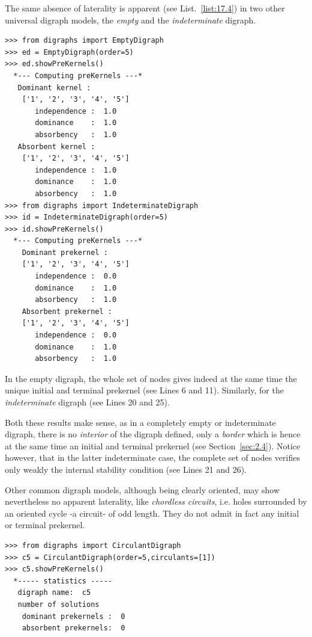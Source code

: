 The same absence of laterality is apparent (see List.~\vref{list:17.4}) in two other universal digraph models, the \emph{empty} and the \emph{indeterminate} digraph. 
\begin{lstlisting}[caption={The prekernels of the empty or indeterminate digraph},label=list:17.4]
>>> from digraphs import EmptyDigraph
>>> ed = EmptyDigraph(order=5)
>>> ed.showPreKernels()
  *--- Computing preKernels ---*
   Dominant kernel :
    ['1', '2', '3', '4', '5']
       independence :  1.0 
       dominance    :  1.0
       absorbency   :  1.0
   Absorbent kernel :
    ['1', '2', '3', '4', '5']
       independence :  1.0 
       dominance    :  1.0
       absorbency   :  1.0
>>> from digraphs import IndeterminateDigraph
>>> id = IndeterminateDigraph(order=5)
>>> id.showPreKernels()
  *--- Computing preKernels ---*
    Dominant prekernel :
    ['1', '2', '3', '4', '5']
       independence :  0.0
       dominance    :  1.0
       absorbency   :  1.0
    Absorbent prekernel :
    ['1', '2', '3', '4', '5']
       independence :  0.0
       dominance    :  1.0
       absorbency   :  1.0
\end{lstlisting}
In the empty digraph, the whole set of nodes gives indeed at the same time the unique initial and terminal prekernel (see Lines 6 and 11). Similarly, for the \emph{indeterminate} digraph (see Lines 20 and 25).

Both these results make sense, as in a completely empty or indeterminate digraph, there is no \emph{interior} of the digraph defined, only a \emph{border} which is hence at the same time an initial and terminal prekernel (see Section~\vref{sec:2.4}).  Notice however, that in the latter indeterminate case, the complete set of nodes verifies only weakly the internal stability condition (see Lines 21 and 26).

Other common digraph models, although being clearly oriented, may show nevertheless no apparent laterality, like \emph{chordless circuits}, i.e. holes surrounded by an oriented cycle -a circuit- of odd length. They do not admit in fact any initial or terminal prekernel.
\begin{lstlisting}[caption={The prekernels of the 5-circuit digraph},label=list:17.5]
>>> from digraphs import CirculantDigraph
>>> c5 = CirculantDigraph(order=5,circulants=[1])
>>> c5.showPreKernels()
  *----- statistics -----
   digraph name:  c5
   number of solutions
    dominant prekernels :  0
    absorbent prekernels:  0
\end{lstlisting}

